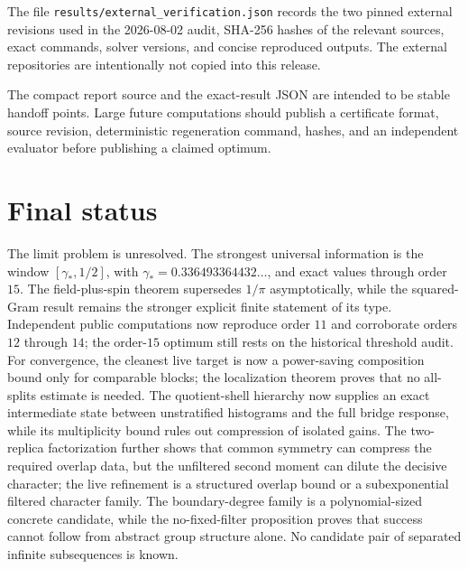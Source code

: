 \documentclass[11pt]{article}
\theoremstyle{definition}
\theoremstyle{remark}
\begin{document}
The file \texttt{results/external\_verification.json} records the two pinned
external revisions used in the 2026-08-02 audit, SHA-256 hashes of the relevant
sources, exact commands, solver versions, and concise reproduced outputs.
The external repositories are intentionally not copied into this release.

The compact report source and the exact-result JSON are intended to be stable
handoff points.  Large future computations should publish a certificate
format, source revision, deterministic regeneration command, hashes, and an
independent evaluator before publishing a claimed optimum.

\section{Final status}

The limit problem is unresolved.  The strongest universal information is the
window $[\gamma_*,1/2]$, with
$\gamma_*=0.336493364432\ldots$, and exact values through order $15$.
The field-plus-spin theorem supersedes $1/\pi$ asymptotically, while the
squared-Gram result remains the stronger explicit finite statement of its
type.  Independent public computations now reproduce order $11$ and
corroborate orders $12$ through $14$; the order-$15$ optimum still rests on
the historical threshold audit.  For convergence, the cleanest live target
is now a power-saving composition bound only for comparable blocks; the
localization theorem proves that no all-splits estimate is needed.  The
quotient-shell hierarchy now supplies an exact intermediate state between
unstratified histograms and the full bridge response, while its multiplicity
bound rules out compression of isolated gains.  The two-replica factorization
further shows that common symmetry can compress the required overlap data,
but the unfiltered second moment can dilute the decisive character; the live
refinement is a structured overlap bound or a subexponential filtered
character family.  The boundary-degree family is a polynomial-sized concrete
candidate, while the no-fixed-filter proposition proves that success cannot
follow from abstract group structure alone.  No candidate pair of separated
infinite subsequences is known.



\end{document}
